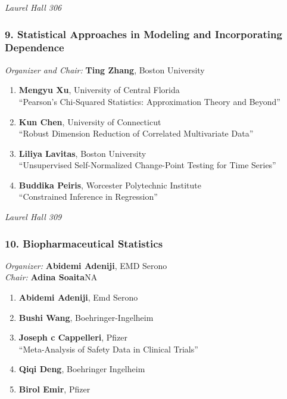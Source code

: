 \emph{Laurel Hall 306} \\[.5em]

\subsubsection*{9. Statistical Approaches in Modeling and Incorporating Dependence}

\emph{Organizer and Chair:} \textbf{Ting Zhang}, Boston University

\begin{enumerate}
\item \textbf{Mengyu Xu}, University of Central Florida \\
``Pearson’s Chi-Squared Statistics: Approximation Theory and Beyond''
\item \textbf{Kun Chen}, University of Connecticut \\
``Robust Dimension Reduction of Correlated Multivariate Data''
\item \textbf{Liliya Lavitas}, Boston University \\
``Unsupervised Self-Normalized Change-Point Testing for Time Series''
\item \textbf{Buddika Peiris}, Worcester Polytechnic Institute \\
``Constrained Inference in Regression''
\end{enumerate}

\emph{Laurel Hall 309} \\[.5em]

\subsubsection*{10. Biopharmaceutical Statistics}

\emph{Organizer:} \textbf{Abidemi Adeniji}, EMD Serono \\
\emph{Chair:} \textbf{Adina Soaita}NA

\begin{enumerate}
\item \textbf{Abidemi Adeniji}, Emd Serono 
\item \textbf{Bushi Wang}, Boehringer-Ingelheim 
\item \textbf{Joseph c Cappelleri}, Pfizer \\
``Meta-Analysis of Safety Data in Clinical Trials''
\item \textbf{Qiqi Deng}, Boehringer Ingelheim 
\item \textbf{Birol Emir}, Pfizer 
\end{enumerate}

